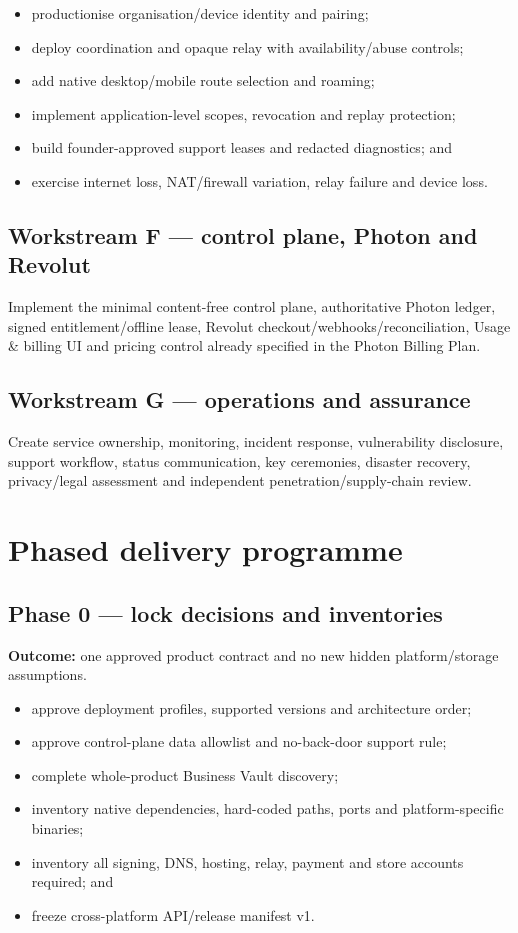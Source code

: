 \documentclass[11pt]{article}
\begin{document}
\begin{itemize}
  \item productionise organisation/device identity and pairing;
  \item deploy coordination and opaque relay with availability/abuse controls;
  \item add native desktop/mobile route selection and roaming;
  \item implement application-level scopes, revocation and replay protection;
  \item build founder-approved support leases and redacted diagnostics; and
  \item exercise internet loss, NAT/firewall variation, relay failure and device loss.
\end{itemize}

\subsection{Workstream F --- control plane, Photon and Revolut}

Implement the minimal content-free control plane, authoritative Photon ledger, signed entitlement/offline lease, Revolut checkout/webhooks/reconciliation, Usage \& billing UI and pricing control already specified in the Photon Billing Plan.

\subsection{Workstream G --- operations and assurance}

Create service ownership, monitoring, incident response, vulnerability disclosure, support workflow, status communication, key ceremonies, disaster recovery, privacy/legal assessment and independent penetration/supply-chain review.

\section{Phased delivery programme}

\subsection{Phase 0 --- lock decisions and inventories}

\textbf{Outcome:} one approved product contract and no new hidden platform/storage assumptions.

\begin{itemize}
  \item approve deployment profiles, supported versions and architecture order;
  \item approve control-plane data allowlist and no-back-door support rule;
  \item complete whole-product Business Vault discovery;
  \item inventory native dependencies, hard-coded paths, ports and platform-specific binaries;
  \item inventory all signing, DNS, hosting, relay, payment and store accounts required; and
  \item freeze cross-platform API/release manifest v1.
\end{itemize}
\end{document}
